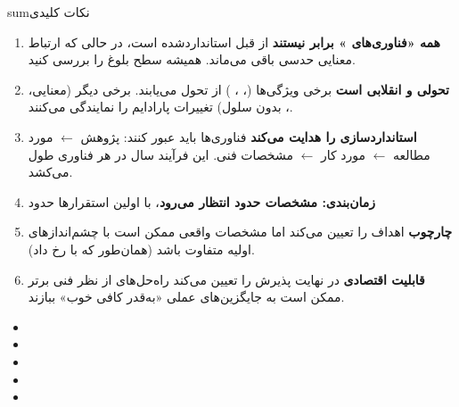 \begin{CNbox}[unbreakable]{sum}{نکات کلیدی}

\begin{enumerate}
\def\labelenumi{\arabic{enumi}.}
\item
  \textbf{همه «فناوری‌های » برابر نیستند}   از قبل استانداردشده است، در حالی که ارتباط معنایی حدسی باقی می‌ماند. همیشه سطح بلوغ را بررسی کنید.
\item
  \textbf{ تحولی و انقلابی است}  برخی ویژگی‌ها (، ، ) از  تحول می‌یابند. برخی دیگر (معنایی، ، بدون سلول) تغییرات پارادایم را نمایندگی می‌کنند.
\item
  \textbf{ استانداردسازی را هدایت می‌کند}  فناوری‌ها باید عبور کنند: پژوهش \ensuremath{\leftarrow} مورد مطالعه \ensuremath{\leftarrow} مورد کار \ensuremath{\leftarrow} مشخصات فنی. این فرآیند  سال در هر فناوری طول می‌کشد.
\item
  \textbf{زمان‌بندی: مشخصات  حدود  انتظار می‌رود}، با اولین استقرارها حدود 
\item
  \textbf{چارچوب } اهداف را تعیین می‌کند اما مشخصات واقعی ممکن است با چشم‌اندازهای اولیه متفاوت باشد (همان‌طور که با  رخ داد).
\item
  \textbf{قابلیت اقتصادی} در نهایت پذیرش را تعیین می‌کند  راه‌حل‌های از نظر فنی برتر ممکن است به جایگزین‌های عملی «به‌قدر کافی خوب» ببازند.
\end{enumerate}

\end{CNbox}



\CNchained{}

\begin{itemize}
\tightlist
\item
\item
\item
\item
\item
\end{itemize}

